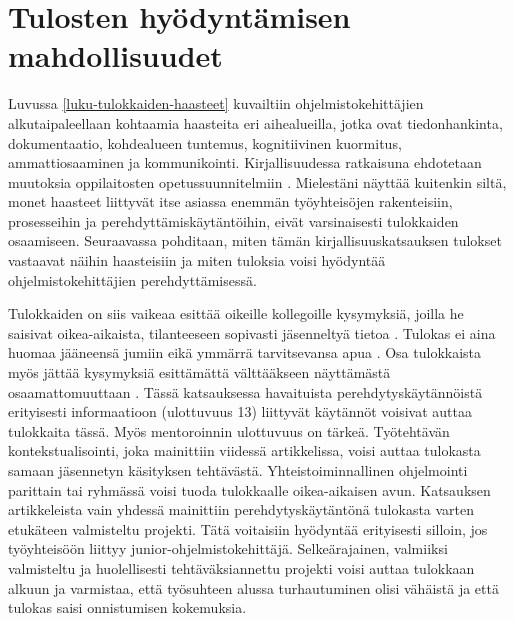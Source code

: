 \documentclass[utf8]{gradu3}
\begin{document}
\section{Tulosten hyödyntämisen mahdollisuudet}

Luvussa \ref{luku-tulokkaiden-haasteet} kuvailtiin ohjelmistokehittäjien alkutaipaleellaan kohtaamia haasteita eri aihealueilla, jotka ovat tiedonhankinta, dokumentaatio, kohdealueen tuntemus, kognitiivinen kuormitus, ammattiosaaminen ja kommunikointi. Kirjallisuudessa ratkaisuna ehdotetaan muutoksia oppilaitosten opetussuunnitelmiin %
\parencites%
    {radermacher-ym-2015}%
    {begel-simon-2008}%
    {begel-simon-2008-all-over-again}%
    {garousi-ym-2020}%
    {kulkarni-ym-2010}%
\relax.
%
Mielestäni näyttää kuitenkin siltä, monet haasteet liittyvät itse asiassa enemmän työyhteisöjen rakenteisiin, prosesseihin ja perehdyttämiskäytäntöihin, eivät varsinaisesti tulokkaiden osaamiseen. Seuraavassa pohditaan, miten tämän kirjallisuuskatsauksen tulokset vastaavat näihin haasteisiin ja miten tuloksia voisi hyödyntää ohjelmistokehittäjien perehdyttämisessä.

Tulokkaiden on siis vaikeaa esittää oikeille kollegoille kysymyksiä, joilla he saisivat oikea-aikaista, tilanteeseen sopivasti jäsenneltyä tietoa %
\parencites%
    {ju-ym-2021}%
    {britto-ym-2019}%
    {craig-ym-2018}%
    {matturro-ym-2017}%
    {dagenais-ym-2010}%
    {begel-simon-2008}%
\relax
%
. 
Tulokas ei aina huomaa jääneensä jumiin eikä ymmärrä tarvitsevansa apua \parencite{begel-simon-2008}. Osa tulokkaista myös jättää kysymyksiä esittämättä välttääkseen näyttämästä osaamattomuuttaan 
\parencites%
    {radermacher-ym-2015}%
    {begel-simon-2008}%
\relax
% 
. Tässä katsauksessa havaituista perehdytyskäytännöistä erityisesti informaatioon (ulottuvuus 13) liittyvät käytännöt voisivat auttaa tulokkaita tässä. Myös mentoroinnin ulottuvuus on tärkeä. Työtehtävän kontekstualisointi, joka mainittiin viidessä artikkelissa, voisi auttaa tulokasta samaan jäsennetyn käsityksen tehtävästä. Yhteistoiminnallinen ohjelmointi parittain tai ryhmässä voisi tuoda tulokkaalle oikea-aikaisen avun. Katsauksen artikkeleista vain yhdessä mainittiin perehdytyskäytäntönä tulokasta varten etukäteen valmisteltu projekti. Tätä voitaisiin hyödyntää erityisesti silloin, jos työyhteisöön liittyy junior-ohjelmistokehittäjä. Selkeärajainen, valmiiksi valmisteltu ja huolellisesti tehtäväksiannettu projekti voisi auttaa tulokkaan alkuun ja varmistaa, että työsuhteen alussa turhautuminen olisi vähäistä ja että tulokas saisi onnistumisen kokemuksia.
\end{document}
